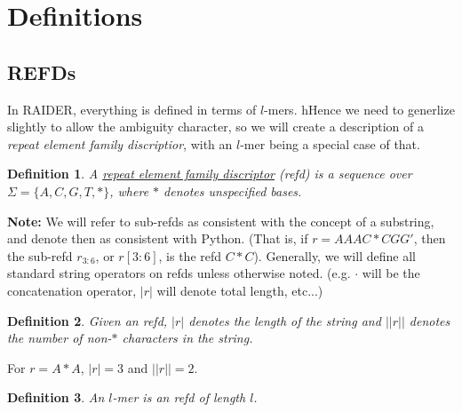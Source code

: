 \documentclass{article}
\newtheorem{definition}{Definition}
\begin{document}
\section{Definitions}

\subsection{REFDs}
In RAIDER, everything is defined in terms of $l$-mers.  hHence we need
to generlize slightly to allow the ambiguity character, so we will
create a description of a {\it repeat element family discriptior},
with an $l$-mer being a special case of that.

\begin{definition}
A \underline{repeat element family discriptor} (refd) is a sequence over
$\Sigma=\{A,C,G,T,*\}$, where $*$ denotes unspecified bases. 
\end{definition}

{\bf Note:} We will refer to sub-refds as consistent with the concept
of a substring, and denote then as consistent with Python.  (That is,
if $r =  AAAC*CGG'$, then the sub-refd $r_{3:6}$, or $r[3:6]$, is the refd
$C*C$).  Generally, we will define all standard string operators on
refds unless otherwise noted.  (e.g. $\cdot$ will be the concatenation
operator, $|r|$ will denote total length, etc...)

\begin{definition}
Given an refd, $|r|$ denotes the length of the string and $||r||$
denotes the number of non-$*$ characters in the string.
\end{definition}
For $r = A*A$, $|r| = 3$ and $||r|| = 2$.

\begin{definition}
An $l$-mer is an refd of length $l$.
\end{definition}
\end{document}
